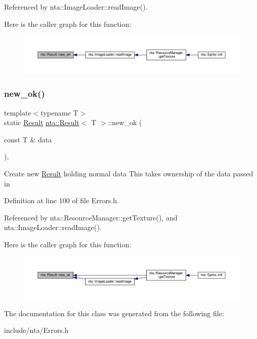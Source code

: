 Referenced by nta\+::\+Image\+Loader\+::read\+Image().

Here is the caller graph for this function\+:\nopagebreak
\begin{figure}[H]
\begin{center}
\leavevmode
\includegraphics[width=350pt]{d8/d2e/classnta_1_1Result_ad65a9140ae2a03cfb13bd30f848b1aa5_icgraph}
\end{center}
\end{figure}
\mbox{\label{classnta_1_1Result_af193a336ab789de94a975c6f0a039e40}} 
\subsubsection{\texorpdfstring{new\+\_\+ok()}{new\_ok()}}
{\footnotesize\ttfamily template$<$typename T$>$ \\
static \hyperlink{classnta_1_1Result}{Result} \hyperlink{classnta_1_1Result}{nta\+::\+Result}$<$ T $>$\+::new\+\_\+ok (\begin{DoxyParamCaption}\item[{const T \&}]{data }\end{DoxyParamCaption})\hspace{0.3cm}{\ttfamily [inline]}, {\ttfamily [static]}}

Create new \hyperlink{classnta_1_1Result}{Result} holding normal data This takes ownership of the data passed in 

Definition at line 100 of file Errors.\+h.



Referenced by nta\+::\+Resource\+Manager\+::get\+Texture(), and nta\+::\+Image\+Loader\+::read\+Image().

Here is the caller graph for this function\+:\nopagebreak
\begin{figure}[H]
\begin{center}
\leavevmode
\includegraphics[width=350pt]{d8/d2e/classnta_1_1Result_af193a336ab789de94a975c6f0a039e40_icgraph}
\end{center}
\end{figure}


The documentation for this class was generated from the following file\+:\begin{DoxyCompactItemize}
\item 
include/nta/Errors.\+h\end{DoxyCompactItemize}
